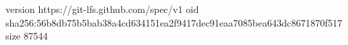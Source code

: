 version https://git-lfs.github.com/spec/v1
oid sha256:56b8db75b5bab38a4cd634151ea2f9417dec91eaa7085bea643dc8671870f517
size 87544
